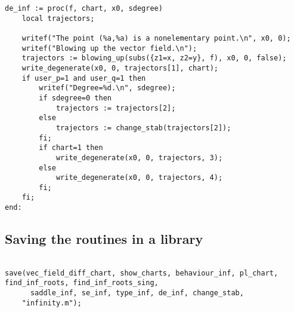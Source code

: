 \documentclass[a4paper,10pt]{article}
\begin{document}
\begin{lstlisting}[name=infinity]
de_inf := proc(f, chart, x0, sdegree)
    local trajectors;

    writef("The point (%a,%a) is a nonelementary point.\n", x0, 0);
    writef("Blowing up the vector field.\n");
    trajectors := blowing_up(subs({z1=x, z2=y}, f), x0, 0, false);
    write_degenerate(x0, 0, trajectors[1], chart);
    if user_p=1 and user_q=1 then
        writef("Degree=%d.\n", sdegree);
        if sdegree=0 then
            trajectors := trajectors[2];
        else
            trajectors := change_stab(trajectors[2]);
        fi;
        if chart=1 then
            write_degenerate(x0, 0, trajectors, 3);
        else
            write_degenerate(x0, 0, trajectors, 4);
        fi;
    fi;
end:

\end{lstlisting}

\subsection{Saving the routines in a library}

\begin{lstlisting}[name=infinity]

save(vec_field_diff_chart, show_charts, behaviour_inf, pl_chart, find_inf_roots, find_inf_roots_sing,
      saddle_inf, se_inf, type_inf, de_inf, change_stab,
    "infinity.m");
\end{lstlisting}
\end{document}
